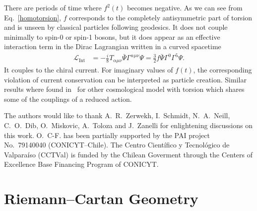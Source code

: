 \documentclass[aps,prd,12pt,superscriptaddress,showpacs,showkeys,longbibliography,reprint,nofootinbib]{revtex4-1}
\begin{document}

There are periods of time where $f^2(t)$ becomes negative. As we can see from Eq.~\eqref{homotorsion}, $f$ corresponds to the completely antisymmetric part of torsion and is unseen by classical particles following geodesics. It does not couple minimally to spin-0 or spin-1 bosons, but it does appear as an effective interaction term in the Dirac Lagrangian written in a curved spacetime~\cite{Hehl:1976kj}
\begin{align*}
  \mathcal{L}_{\text{Int}}&=-\frac{i}{8}T_{\alpha\mu\nu}\bar{\Psi}\Gamma^{\alpha\mu\nu}\Psi =\frac{3}{2}f\bar{\Psi}\Gamma^0\Gamma^5\Psi.
\end{align*}
It couples to the chiral current. For imaginary values of $f(t)$, the corresponding violation of current conservation can be interpreted as particle creation. Similar results where found in~\cite{Toloza:2013wi} for other cosmological model with torsion which shares some of the couplings of a reduced action.

\begin{acknowledgments}
  The authors would like to thank A.~R.~Zerwekh, I.~Schmidt, N.~A.~Neill, C.~O.~Dib, O.~Miskovic, A.~Toloza and J.~Zanelli for enlightening discussions on this work. O.~C-F. has been partially supported by the PAI project No.~79140040 (CONICYT--Chile). The Centro Cient\'ifico y Tecnol\'ogico de Valpara\'iso (CCTVal) is funded by the Chilean Goverment through the Centers of Excellence Base Financing Program of CONICYT.
\end{acknowledgments}


\appendix

\section{Riemann--Cartan Geometry\label{Riemann-Cartan}}
\end{document}
